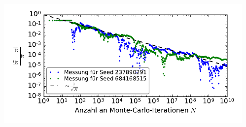 \begin{frame}
\begin{columns}
\begin{column}{0.35\linewidth}
    \end{column}\begin{column}{0.65\linewidth}
        \centerline{\includegraphics[width=1.1\linewidth]{monte-carlo-pi-error-scaling.pdf}}
    \end{column}\end{columns}
\end{frame}

%

